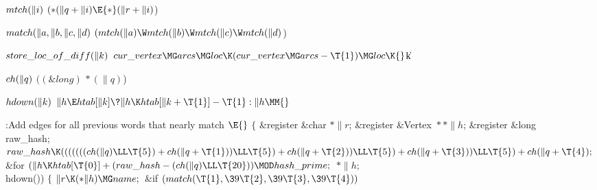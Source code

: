 \Y\B\4\D$\\{mtch}(\|i)$ \5
$({*}(\|q+\|i)\E{*}(\|r+\|i){}$)\par
\B\4\D$\\{match}(\|a,\|b,\|c,\|d)$ \5
$(\\{mtch}(\|a)\W\\{mtch}(\|b)\W\\{mtch}(\|c)\W\\{mtch}(\|d){}$)\par
\B\4\D$\\{store\_loc\_of\_diff}(\|k)$ \5
$\\{cur\_vertex}\MG\\{arcs}\MG\\{loc}\K(\\{cur\_vertex}\MG\\{arcs}-\T{1})\MG%
\\{loc}\K{}$\|k\par
\B\4\D$\\{ch}(\|q)$ \5
$((\&{long})\,{*}(\|q){}$)\par
\B\4\D$\\{hdown}(\|k)$ \5
$\|h\E\\{htab}[\|k]\?\|h\K\\{htab}[\|k+\T{1}]-\T{1}:\|h\MM{}$\par
\Y\B\4:Add edges for all previous words  that nearly match %
\X${}\E{}$\6
${}\{{}$\5
\1\&{register} \&{char} ${}{*}\|r{}$;\6
\&{register} \&{Vertex} ${}{*}{*}\|h{}$;\6
\&{register} \&{long} \\{raw\_hash};\7
${}\\{raw\_hash}\K(((((((\\{ch}(\|q)\LL\T{5})+\\{ch}(\|q+\T{1}))\LL\T{5})+%
\\{ch}(\|q+\T{2}))\LL\T{5})+\\{ch}(\|q+\T{3}))\LL\T{5})+\\{ch}(\|q+\T{4});{}$\6
\&{for} ${}(\|h\K\\{htab}[\T{0}]+(\\{raw\_hash}-(\\{ch}(\|q)\LL\T{20}))\MOD%
\\{hash\_prime};{}$ ${}{*}\|h;{}$ \\{hdown}())\5
${}\{{}$\1\6
${}\|r\K({*}\|h)\MG\\{name};{}$\6
\&{if} ${}(\\{match}(\T{1},\39\T{2},\39\T{3},\39\T{4})){}$\1\5
